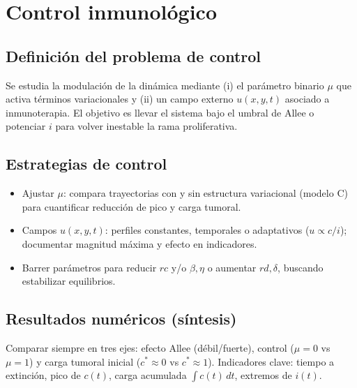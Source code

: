 \chapter{Control inmunológico}

\section{Definición del problema de control}
Se estudia la modulación de la dinámica mediante (i) el parámetro binario $\mu$ que activa términos variacionales y (ii) un campo externo $u(x,y,t)$ asociado a inmunoterapia. El objetivo es llevar el sistema bajo el umbral de Allee o potenciar $i$ para volver inestable la rama proliferativa.

\section{Estrategias de control}
\begin{itemize}
  \item Ajustar $\mu$: compara trayectorias con y sin estructura variacional (modelo C) para cuantificar reducción de pico y carga tumoral.
  \item Campos $u(x,y,t)$: perfiles constantes, temporales o adaptativos ($u\propto c/i$); documentar magnitud máxima y efecto en indicadores.
  \item Barrer parámetros para reducir $rc$ y/o $\beta,\eta$ o aumentar $rd,\delta$, buscando estabilizar equilibrios.
\end{itemize}

\section{Resultados numéricos (síntesis)}
Comparar siempre en tres ejes: efecto Allee (débil/fuerte), control ($\mu=0$ vs $\mu=1$) y carga tumoral inicial ($c^*\approx0$ vs $c^*\approx1$). Indicadores clave: tiempo a extinción, pico de $c(t)$, carga acumulada $\int c(t)\,dt$, extremos de $i(t)$.

